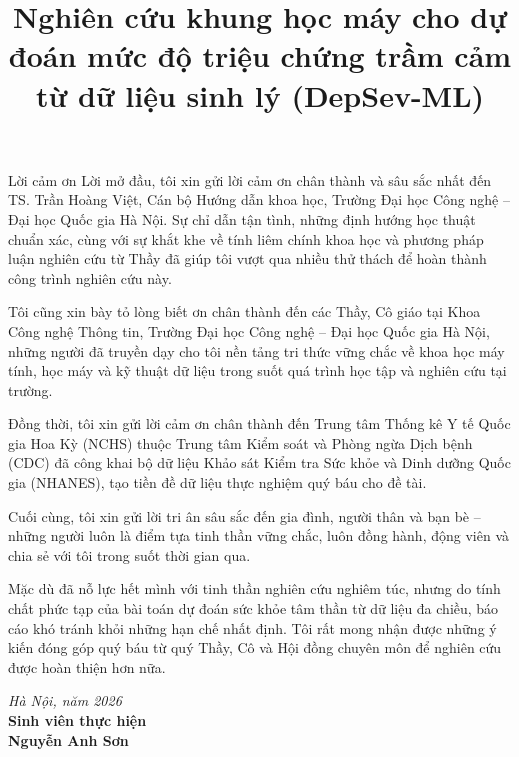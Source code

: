 \documentclass{uetgraduation}
\begin{document}
\title{Nghiên cứu khung học máy cho dự đoán mức độ triệu chứng trầm cảm từ dữ liệu sinh lý (DepSev-ML)}

\makecovers

\pagestyle{plain}

\begin{preamble}{Lời cảm ơn}
Lời mở đầu, tôi xin gửi lời cảm ơn chân thành và sâu sắc nhất đến TS. Trần Hoàng Việt, Cán bộ Hướng dẫn khoa học, Trường Đại học Công nghệ -- Đại học Quốc gia Hà Nội. Sự chỉ dẫn tận tình, những định hướng học thuật chuẩn xác, cùng với sự khắt khe về tính liêm chính khoa học và phương pháp luận nghiên cứu từ Thầy đã giúp tôi vượt qua nhiều thử thách để hoàn thành công trình nghiên cứu này.

Tôi cũng xin bày tỏ lòng biết ơn chân thành đến các Thầy, Cô giáo tại Khoa Công nghệ Thông tin, Trường Đại học Công nghệ -- Đại học Quốc gia Hà Nội, những người đã truyền dạy cho tôi nền tảng tri thức vững chắc về khoa học máy tính, học máy và kỹ thuật dữ liệu trong suốt quá trình học tập và nghiên cứu tại trường.

Đồng thời, tôi xin gửi lời cảm ơn chân thành đến Trung tâm Thống kê Y tế Quốc gia Hoa Kỳ (NCHS) thuộc Trung tâm Kiểm soát và Phòng ngừa Dịch bệnh (CDC) đã công khai bộ dữ liệu Khảo sát Kiểm tra Sức khỏe và Dinh dưỡng Quốc gia (NHANES), tạo tiền đề dữ liệu thực nghiệm quý báu cho đề tài.

Cuối cùng, tôi xin gửi lời tri ân sâu sắc đến gia đình, người thân và bạn bè -- những người luôn là điểm tựa tinh thần vững chắc, luôn đồng hành, động viên và chia sẻ với tôi trong suốt thời gian qua.

Mặc dù đã nỗ lực hết mình với tinh thần nghiên cứu nghiêm túc, nhưng do tính chất phức tạp của bài toán dự đoán sức khỏe tâm thần từ dữ liệu đa chiều, báo cáo khó tránh khỏi những hạn chế nhất định. Tôi rất mong nhận được những ý kiến đóng góp quý báu từ quý Thầy, Cô và Hội đồng chuyên môn để nghiên cứu được hoàn thiện hơn nữa.

\vspace{1.5cm}
\begin{flushright}
\textit{Hà Nội, năm 2026}\\[0.2cm]
\textbf{Sinh viên thực hiện}\\[1.5cm]
\textbf{Nguyễn Anh Sơn}
\end{flushright}
\end{preamble}
\end{document}
